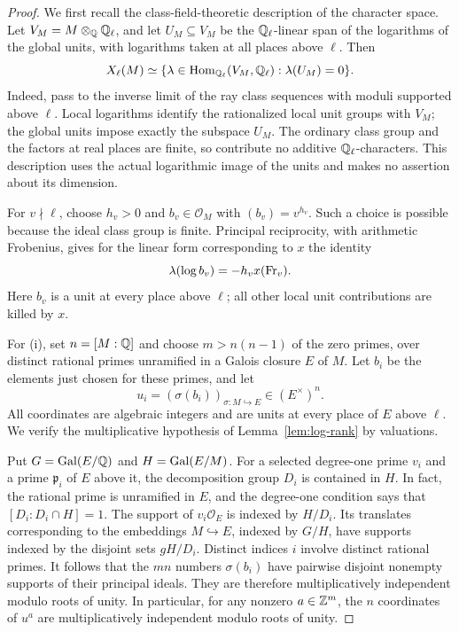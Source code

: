 \begin{proof}
We first recall the class-field-theoretic description of the character
space.  Let $V_M=M\otimes_\mathbb Q\mathbb Q_\ell$, and let $U_M\subseteq V_M$
be the $\mathbb Q_\ell$-linear span of the logarithms of the global units,
with logarithms taken at all places above $\ell$.  Then
\begin{equation}\label{eq:character-class-field}
 X_{\ell}(M)\simeq
 \{\lambda\in\operatorname{Hom}_{\mathbb Q_\ell}(V_M,\mathbb Q_\ell):
                         \lambda(U_M)=0\}.
\end{equation}
Indeed, pass to the inverse limit of the ray class sequences with
moduli supported above $\ell$.  Local logarithms identify the
rationalized local unit groups with $V_M$; the global units impose
exactly the subspace $U_M$.  The ordinary class group and the factors
at real places are finite, so contribute no additive
$\mathbb Q_\ell$-characters.  This description uses the actual logarithmic
image of the units and makes no assertion about its dimension.

For $v\nmid\ell$, choose $h_v>0$ and $b_v\in\mathcal O_M$ with
$(b_v)=v^{h_v}$.  Such a choice is possible because the ideal class
group is finite.  Principal reciprocity, with arithmetic Frobenius,
gives for the linear form corresponding to $x$ the identity
\begin{equation}\label{eq:character-principal-reciprocity}
 \lambda(\log b_v)=-h_vx(\operatorname{Fr}_v).
\end{equation}
Here $b_v$ is a unit at every place above $\ell$; all other local
unit contributions are killed by $x$.

For (i), set $n=[M:\mathbb Q]$ and choose $m>n(n-1)$ of the zero primes,
over distinct rational primes unramified in a Galois closure $E$ of
$M$.  Let $b_i$ be the elements just chosen for these primes, and
let
\[
 u_i=(\sigma(b_i))_{\sigma:M\hookrightarrow E}\in(E^\times)^n.
\]
All coordinates are algebraic integers and are units at every place
of $E$ above $\ell$.  We verify the multiplicative hypothesis of
Lemma~\ref{lem:log-rank} by valuations.

Put $G=\operatorname{Gal}(E/\mathbb Q)$ and $H=\operatorname{Gal}(E/M)$.  For a selected degree-one
prime $v_i$ and a prime $\mathfrak p_i$ of $E$ above it, the
decomposition group $D_i$ is contained in $H$.  In fact, the rational
prime is unramified in $E$, and the degree-one condition says that
$[D_i:D_i\cap H]=1$.  The support of $v_i\mathcal O_E$ is
indexed by $H/D_i$.  Its translates corresponding to the embeddings
$M\hookrightarrow E$, indexed by $G/H$, have supports indexed by
the disjoint sets $gH/D_i$.  Distinct indices $i$ involve distinct
rational primes.  It follows that the $mn$ numbers
$\sigma(b_i)$ have pairwise disjoint nonempty supports of their
principal ideals.  They are therefore multiplicatively independent
modulo roots of unity.  In particular, for any nonzero
$a\in\mathbb Z^m$, the $n$ coordinates of $u^a$ are multiplicatively
independent modulo roots of unity.


\end{proof}
